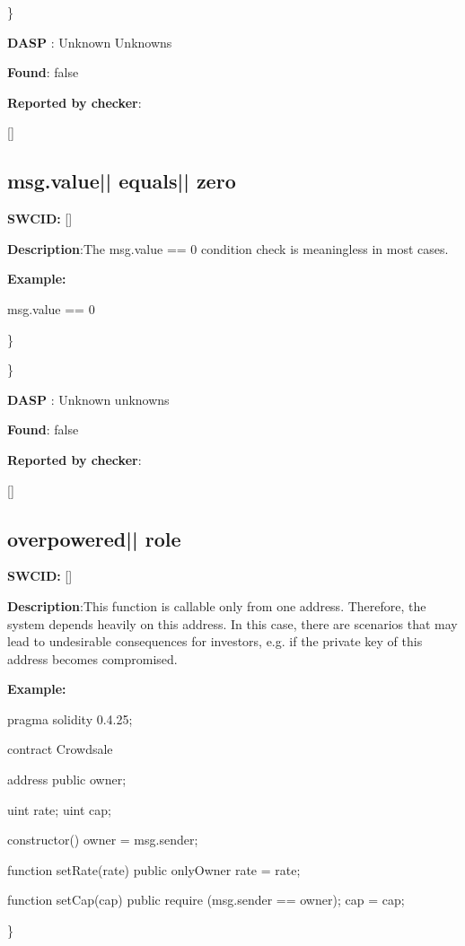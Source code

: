 \documentclass{article}
\begin{document}
\} 

\textbf{DASP} : Unknown Unknowns

\textbf{Found}: false

\textbf{Reported by checker}: 
\begin{ffcode} 

[]
\end{ffcode} 
\subsection{msg.value{|\textunderscore| }equals{|\textunderscore| }zero} 
\textbf{SWC{\textunderscore }ID:} []

\textbf{Description}:The msg.value == 0 condition check is meaningless in most cases.


\textbf{Example:} 
\begin{ffcode} 

msg.value == 0

\end{ffcode} 
\} 

\} 

\textbf{DASP} : Unknown unknowns

\textbf{Found}: false

\textbf{Reported by checker}: 
\begin{ffcode} 

[]
\end{ffcode} 
\subsection{overpowered{|\textunderscore| }role} 
\textbf{SWC{\textunderscore }ID:} []

\textbf{Description}:This function is callable only from one address. Therefore, the system depends heavily on this address. In this case, there are scenarios that may lead to undesirable consequences for investors, e.g. if the private key of this address becomes compromised.


\textbf{Example:} 
\begin{ffcode} 

pragma solidity 0.4.25;

contract Crowdsale {

    address public owner;

    uint rate;
    uint cap;

    constructor() {
        owner = msg.sender;
    }

    function setRate(\textunderscore rate) public onlyOwner {
        rate = \textunderscore rate;
    }

    function setCap(\textunderscore cap) public {
        require (msg.sender == owner);
        cap = \textunderscore cap;
    }
}

\end{ffcode} 
\} 
\end{document}
